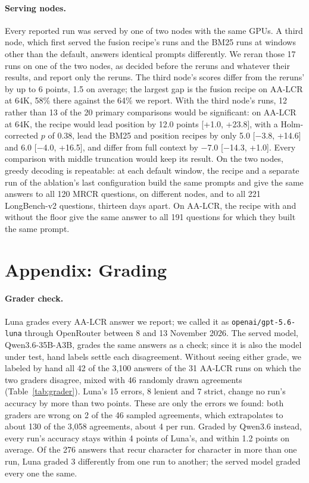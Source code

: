 \documentclass[letterpaper]{article} %
\newcommand{\recipe}{fusion recipe}
\begin{document}
\paragraph{Serving nodes.} Every reported run was served by one of two nodes with the same GPUs. A third node, which first served the \recipe's runs and the BM25 runs at windows other than the default, answers identical prompts differently. We reran those 17 runs on one of the two nodes, as decided before the reruns and whatever their results, and report only the reruns. The third node's scores differ from the reruns' by up to 6 points, 1.5 on average; the largest gap is the \recipe{} on AA-LCR at 64K, 58\% there against the 64\% we report. With the third node's runs, 12 rather than 13 of the 20 primary comparisons would be significant: on AA-LCR at 64K, the recipe would lead position by 12.0 points [+1.0, +23.8], with a Holm-corrected $p$ of 0.38, lead the BM25 and position recipes by only 5.0 [$-$3.8, +14.6] and 6.0 [$-$4.0, +16.5], and differ from full context by $-$7.0 [$-$14.3, +1.0]. Every comparison with middle truncation would keep its result. On the two nodes, greedy decoding is repeatable: at each default window, the recipe and a separate run of the ablation's last configuration build the same prompts and give the same answers to all 120 MRCR questions, on different nodes, and to all 221 LongBench-v2 questions, thirteen days apart. On AA-LCR, the recipe with and without the floor give the same answer to all 191 questions for which they built the same prompt.

\section{Appendix: Grading}
\paragraph{Grader check.} Luna grades every AA-LCR answer we report; we called it as \texttt{openai/gpt-5.6-luna} through OpenRouter between 8 and 13 November 2026. The served model, Qwen3.6-35B-A3B, grades the same answers as a check; since it is also the model under test, hand labels settle each disagreement. Without seeing either grade, we labeled by hand all 42 of the 3,100 answers of the 31 AA-LCR runs on which the two graders disagree, mixed with 46 randomly drawn agreements (Table~\ref{tab:grader}). Luna's 15 errors, 8 lenient and 7 strict, change no run's accuracy by more than two points. These are only the errors we found: both graders are wrong on 2 of the 46 sampled agreements, which extrapolates to about 130 of the 3,058 agreements, about 4 per run. Graded by Qwen3.6 instead, every run's accuracy stays within 4 points of Luna's, and within 1.2 points on average. Of the 276 answers that recur character for character in more than one run, Luna graded 3 differently from one run to another; the served model graded every one the same.
\end{document}
